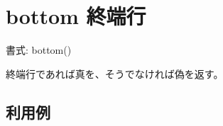 
%

\section{bottom 終端行\label{sect:bottom}}

書式: bottom()

終端行であれば真を、そうでなければ偽を返す。

\subsection*{利用例}


%

